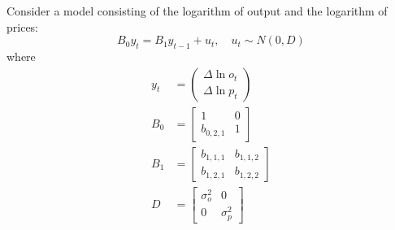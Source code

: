 Consider a \varp[1]{} model consisting of the logarithm of output and the logarithm of prices:
\[ B_0 y_t = B_1 y_{t-1} + u_t, \quad u_t \sim N(0, D) \]
where
\begin{align*}
    y_t & = \begin{pmatrix} \Delta \ln o_t \\ \Delta \ln p_t \end{pmatrix}
    \\
    B_0 & = \begin{bmatrix}
                1           & 0 \\
                b_{0, 2, 1} & 1
            \end{bmatrix}
    \\
    B_1 & = \begin{bmatrix}
                b_{1, 1, 1} & b_{1, 1, 2} \\
                b_{1, 2, 1} & b_{1, 2, 2}
            \end{bmatrix}
    \\
    D   & = \begin{bmatrix} \sigma_o^2 & 0 \\ 0 & \sigma_p^2 \end{bmatrix}
\end{align*}

